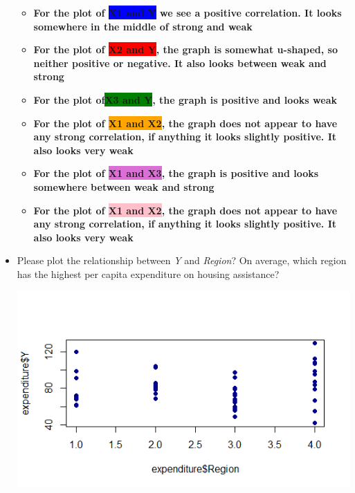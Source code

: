 \documentclass[12pt,letterpaper]{article}
\begin{document}
\begin{itemize}
\begin{itemize}
	\item \textbf{For the plot of \colorbox{blue}{X1 and Y} we see a positive correlation. It looks somewhere in the middle of strong and weak}
	
	\item \textbf{For the plot of \colorbox{red}{X2 and Y}, the graph is somewhat u-shaped, so neither positive or negative. It also looks between weak and strong}
	
	\item \textbf{For the plot of\colorbox{green}{X3 and Y}, the graph is positive and looks weak}
	
	\item \textbf{For the plot of \colorbox{orange}{X1 and X2}, the graph does not appear to have any strong correlation, if anything it looks slightly positive. It also looks very weak}
	
	
	
	\item \textbf{For the plot of \colorbox{Orchid}{X1 and X3}, the graph is positive and looks somewhere between weak and strong}
	
	\item \textbf{For the plot of \colorbox{pink}{X1 and X2}, the graph does not appear to have any strong correlation, if anything it looks slightly positive. It also looks very weak}
\end{itemize}
	

\vspace{.5cm}
\item
Please plot the relationship between \emph{Y} and \emph{Region}? On average, which region has the highest per capita expenditure on housing assistance?
\vspace{0cm}


 \includegraphics[width=.8\textwidth]{Y_Region}\hfill
		


	\begin{itemize}
		

\end{itemize}
\end{itemize}
\end{document}
